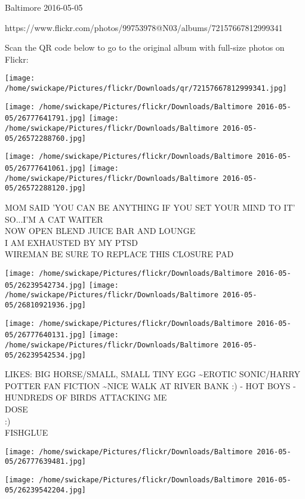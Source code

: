 \documentclass[10pt,letterpaper]{article}
\begin{document}
Baltimore 2016-05-05

https://www.flickr.com/photos/99753978@N03/albums/72157667812999341

Scan the QR code below to go to the original album with full-size photos on Flickr:

\texttt{[image: /home/swickape/Pictures/flickr/Downloads/qr/72157667812999341.jpg]}
\pagebreak

\texttt{[image: /home/swickape/Pictures/flickr/Downloads/Baltimore 2016-05-05/26777641791.jpg]}
\texttt{[image: /home/swickape/Pictures/flickr/Downloads/Baltimore 2016-05-05/26572288760.jpg]}

\texttt{[image: /home/swickape/Pictures/flickr/Downloads/Baltimore 2016-05-05/26777641061.jpg]}
\texttt{[image: /home/swickape/Pictures/flickr/Downloads/Baltimore 2016-05-05/26572288120.jpg]}

MOM SAID 'YOU CAN BE ANYTHING IF YOU SET YOUR MIND TO IT' SO...I'M A CAT WAITER\\
NOW OPEN BLEND JUICE BAR AND LOUNGE\\
I AM EXHAUSTED BY MY PTSD\\
WIREMAN BE SURE TO REPLACE THIS CLOSURE PAD\\
\pagebreak

\texttt{[image: /home/swickape/Pictures/flickr/Downloads/Baltimore 2016-05-05/26239542734.jpg]}
\texttt{[image: /home/swickape/Pictures/flickr/Downloads/Baltimore 2016-05-05/26810921936.jpg]}

\texttt{[image: /home/swickape/Pictures/flickr/Downloads/Baltimore 2016-05-05/26777640131.jpg]}
\texttt{[image: /home/swickape/Pictures/flickr/Downloads/Baltimore 2016-05-05/26239542534.jpg]}

LIKES: BIG HORSE/SMALL, SMALL TINY EGG \textasciitilde{}EROTIC SONIC/HARRY POTTER FAN FICTION \textasciitilde{}NICE WALK AT RIVER BANK :) {-} HOT BOYS {-} HUNDREDS OF BIRDS ATTACKING ME\\
DOSE\\
:)\\
FISHGLUE\\
\pagebreak

\texttt{[image: /home/swickape/Pictures/flickr/Downloads/Baltimore 2016-05-05/26777639481.jpg]}

\vspace{0.25in}
\texttt{[image: /home/swickape/Pictures/flickr/Downloads/Baltimore 2016-05-05/26239542204.jpg]}
\end{document}
